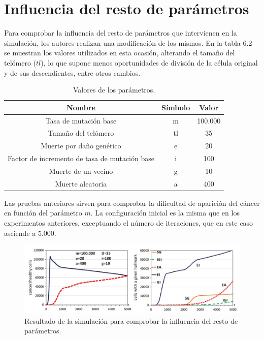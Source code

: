 \section{Influencia del resto de parámetros}

Para comprobar la influencia del resto de parámetros que intervienen en la simulación,
los autores realizan una modificación de los mismos. En la tabla 6.2 se muestran los valores
utilizados en esta ocasión, alterando el tamaño del telómero ($tl$), lo que supone
menos oportunidades de división de la célula original y de sus descendientes, entre otros
cambios.

\begin{table}[h!]
  \centering
  \caption{Valores de los parámetros.}
  \label{tab:table1}
  \begin{tabular}{ccc}
    \toprule
    Nombre & Símbolo & Valor\\
    \midrule
    Tasa de mutación base & m & 100.000\\
    Tamaño del telómero & tl & 35\\
    Muerte por daño genético & e & 20\\
    Factor de incremento de tasa de mutación base & i & 100\\
    Muerte de un vecino & g & 10\\
    Muerte aleatoria & a & 400\\
    \bottomrule
  \end{tabular}
\end{table}

Las pruebas anteriores sirven para comprobar la dificultad de aparición del cáncer en
función del parámetro $m$. La configuración inicial es la misma que en los experimentos
anteriores, exceptuando el número de iteraciones, que en este caso asciende a $5.000$.

\begin{figure}[h]
\centering
\includegraphics[scale=0.8]{figures/experiments/exp4}
\caption{Resultado de la simulación para comprobar la influencia del resto de parámetros.}
\label{fig:exp4}
\end{figure}

